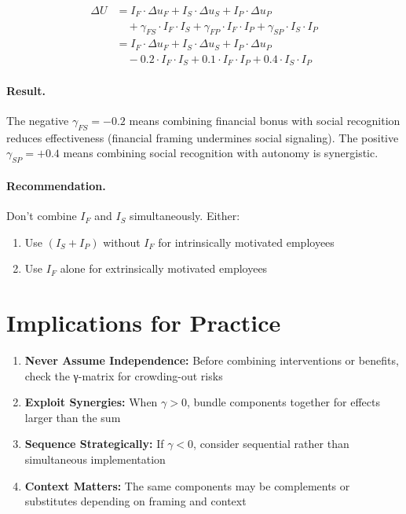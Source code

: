 \begin{align}
\Delta U &= I_F \cdot \Delta u_F + I_S \cdot \Delta u_S + I_P \cdot \Delta u_P \\
&\quad + \gamma_{FS} \cdot I_F \cdot I_S + \gamma_{FP} \cdot I_F \cdot I_P + \gamma_{SP} \cdot I_S \cdot I_P \\
&= I_F \cdot \Delta u_F + I_S \cdot \Delta u_S + I_P \cdot \Delta u_P \\
&\quad - 0.2 \cdot I_F \cdot I_S + 0.1 \cdot I_F \cdot I_P + 0.4 \cdot I_S \cdot I_P
\end{align}

\paragraph{Result.}
The negative $\gamma_{FS} = -0.2$ means combining financial bonus with social recognition
reduces effectiveness (financial framing undermines social signaling).
The positive $\gamma_{SP} = +0.4$ means combining social recognition with autonomy is synergistic.

\paragraph{Recommendation.}
Don't combine $I_F$ and $I_S$ simultaneously. Either:
\begin{enumerate}
\item Use $(I_S + I_P)$ without $I_F$ for intrinsically motivated employees
\item Use $I_F$ alone for extrinsically motivated employees
\end{enumerate}


\section{Implications for Practice}
\label{sec:how-practice}

\begin{tcolorbox}[colback=green!5!white, colframe=green!75!black,
    title=Practical Implications]
\begin{enumerate}
\item \textbf{Never Assume Independence:} Before combining interventions or
      benefits, check the γ-matrix for crowding-out risks
\item \textbf{Exploit Synergies:} When $\gamma > 0$, bundle components together
      for effects larger than the sum
\item \textbf{Sequence Strategically:} If $\gamma < 0$, consider sequential
      rather than simultaneous implementation
\item \textbf{Context Matters:} The same components may be complements or
      substitutes depending on framing and context
\end{enumerate}
\end{tcolorbox}


